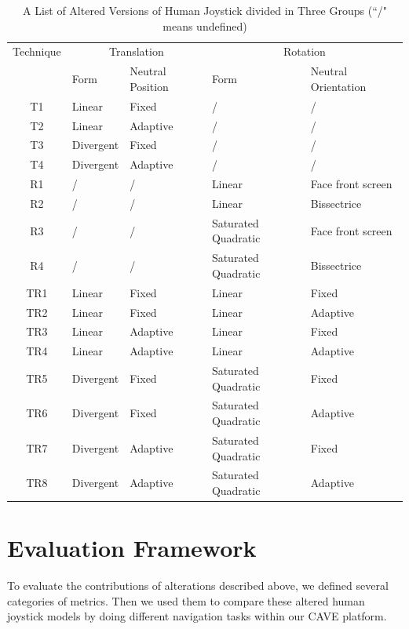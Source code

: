 \begin{table}[hbt]
\renewcommand{\arraystretch}{1.3}
\caption{A List of Altered Versions of Human Joystick divided in Three Groups (``/" means undefined)}
\label{tab:4_combinations}
\centering
\begin{tabular}{c l l l l}
  \hline
  Technique & \multicolumn{2}{c}{Translation} & \multicolumn{2}{c}{Rotation} \\
   & Form & Neutral Position & Form & Neutral Orientation \\ \hline
  T1 & Linear & Fixed & / & / \\
  T2 & Linear & Adaptive & / & / \\
  T3 & Divergent & Fixed & / & / \\
  T4 & Divergent & Adaptive & / & / \\ \hline
  R1 & / & / & Linear & Face front screen \\
  R2 & / & / & Linear & Bissectrice \\
  R3 & / & / & Saturated Quadratic & Face front screen \\
  R4 & / & / & Saturated Quadratic & Bissectrice \\ \hline
  TR1 & Linear & Fixed & Linear & Fixed \\ TR2 & Linear & Fixed & Linear & Adaptive \\
  TR3 & Linear & Adaptive & Linear & Fixed \\ TR4 & Linear & Adaptive & Linear & Adaptive \\
  TR5 & Divergent & Fixed & Saturated Quadratic & Fixed \\ TR6 & Divergent & Fixed & Saturated Quadratic & Adaptive \\
  TR7 & Divergent & Adaptive & Saturated Quadratic & Fixed \\ TR8 & Divergent & Adaptive & Saturated Quadratic & Adaptive \\
  \hline
\end{tabular}
\end{table}




\section{Evaluation Framework}
To evaluate the contributions of alterations described above, we defined several categories of metrics. Then we used them to compare these altered human joystick models by doing different navigation tasks within our CAVE platform.

